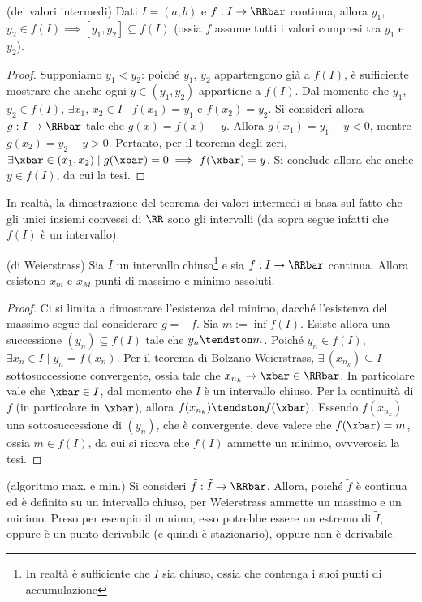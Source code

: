 \documentclass[11pt]{article}
\begin{document}
	\begin{corollary} (dei valori intermedi) Dati $I = (a, b)$ e
		$f : I \to \RRbar$ continua, allora $y_1$, $y_2 \in f(I) \implies
		[y_1, y_2] \subseteq f(I)$ (ossia $f$ assume tutti i valori
		compresi tra $y_1$ e $y_2$).
	\end{corollary}

	\begin{proof}
		Supponiamo $y_1 < y_2$: poiché $y_1$, $y_2$ appartengono già a $f(I)$, è sufficiente mostrare che anche ogni $y \in (y_1, y_2)$ appartiene a $f(I)$. Dal momento che $y_1$, $y_2 \in f(I)$, $\exists x_1$, $x_2 \in I \mid f(x_1) = y_1$ e $f(x_2) = y_2$. Si consideri allora $g : I \to \RRbar$ tale che
		$g(x) = f(x) - y$. Allora $g(x_1) = y_1 - y < 0$, mentre $g(x_2) = y_2 - y > 0$. Pertanto, per il teorema
		degli zeri, $\exists \xbar \in (x_1, x_2) \mid g(\xbar) = 0 \implies f(\xbar) = y$. Si conclude allora che anche
		$y \in f(I)$, da cui la tesi. 
	\end{proof}

	\begin{remark}
		In realtà, la dimostrazione del teorema dei valori intermedi
		si basa sul fatto che gli unici insiemi convessi di $\RR$ sono
		gli intervalli (da sopra segue infatti che $f(I)$ è un intervallo).
	\end{remark}

	\begin{theorem} (di Weierstrass) Sia $I$ un intervallo chiuso\footnote{In realtà è sufficiente che $I$ sia chiuso, ossia che contenga i suoi punti
	di accumulazione} e sia
		$f : I \to \RRbar$ continua. Allora esistono $x_m$ e $x_M$ punti
		di massimo e minimo assoluti.
	\end{theorem}

	\begin{proof}
		Ci si limita a dimostrare l'esistenza del minimo, dacché l'esistenza
		del massimo segue dal considerare $g = -f$. Sia $m := \inf f(I)$.
		Esiste allora una successione $(y_n) \subseteq f(I)$ tale che
		$y_n \tendston m$. Poiché $y_n \in f(I)$, $\exists x_n \in I \mid
		y_n = f(x_n)$. Per il teorema di Bolzano-Weierstrass, $\exists \, (x_{n_k})
		\subseteq I$ sottosuccessione convergente, ossia tale che
		$x_{n_k} \to \xbar \in \RRbar$. In particolare vale che
		$\xbar \in I$, dal momento che $I$ è un intervallo chiuso. %
		Per la continuità di $f$ (in particolare in $\xbar$), allora $f(x_{n_k}) \tendston f(\xbar)$.
		Essendo $f(x_{n_k})$ una sottosuccessione di $(y_n)$, che è
		convergente, deve valere che $f(\xbar) = m$, ossia
		$m \in f(I)$, da cui si ricava che $f(I)$ ammette un minimo,
		ovvverosia la tesi.
	\end{proof}
	
	\begin{remark} (algoritmo max. e min.) Si consideri $\tilde{f} : \tilde{I} \to \RRbar$. Allora, poiché $\tilde{f}$ è continua ed è definita su
		un intervallo chiuso, per Weierstrass ammette un massimo e un
		minimo. Preso per esempio il minimo, esso potrebbe essere un
		estremo di $\tilde{I}$, oppure è un punto derivabile (e quindi è
			stazionario), oppure non è derivabile.
	\end{remark}
	
\end{document}
